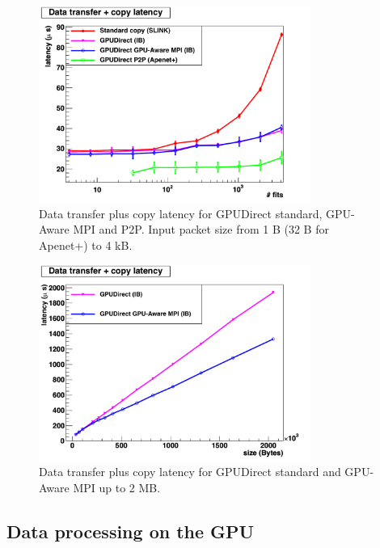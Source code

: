 \documentclass[journal]{IEEEtran}
\begin{document}
\begin{figure}[!t]
\centering
\includegraphics[width=3.5in]{figures/DT_MC_SLINK_IB_APE_low}
\caption{Data transfer plus copy latency for GPUDirect standard, 
GPU-Aware MPI and P2P. Input packet size from 1 B (32 B for Apenet+) to 4 kB.}
\label{fig_DT_MC_SLINK_IB_APE_low}
\end{figure}




\begin{figure}[!t]
\centering
\includegraphics[width=3.5in]{figures/MC_IB_high}
\caption{Data transfer plus copy latency for GPUDirect standard 
 and GPU-Aware MPI up to 2 MB.}
\label{fig_DT_MC_GPUDirect_high}
\end{figure}



\subsection{Data processing on the GPU}
\end{document}
